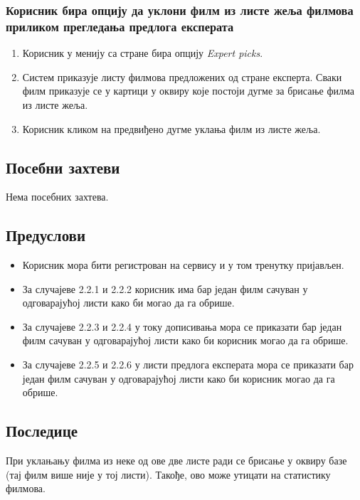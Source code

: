 \subsubsection{Корисник бира опцију да уклони филм из листе жеља филмова приликом прегледања 
предлога експерата}

\begin{enumerate}
    \item Корисник у менију са стране бира опцију \textit{Expert picks}.
    \item Систем приказује листу филмова предложених од стране експерта. Сваки филм 
    приказује се у картици у оквиру које постоји дугме за брисање филма из листе жеља.
    \item Корисник кликом на предвиђено дугме уклања филм из листе жеља.
\end{enumerate}

\subsection{Посебни захтеви}

Нема посебних захтева.

\subsection{Предуслови}

\begin{itemize}
    \item Корисник мора бити регистрован на сервису и у том тренутку пријављен. 
    \item За случајеве 2.2.1 и 2.2.2 корисник има бар један филм сачуван у одговарајућој листи како би могао да га обрише.
    \item За случајеве 2.2.3 и 2.2.4 у току дописивања мора се приказати бар један филм сачуван у одговарајућој листи како би корисник могао да га обрише.
    \item За случајеве 2.2.5 и 2.2.6 у листи предлога експерата мора се приказати бар један филм сачуван у одговарајућој листи како би корисник могао да га обрише.
\end{itemize}

\subsection{Последице}

При уклањању филма из неке од ове две листе ради се брисање у оквиру базе (тај филм више није у тој листи). Такође,
ово може утицати на статистику филмова.

